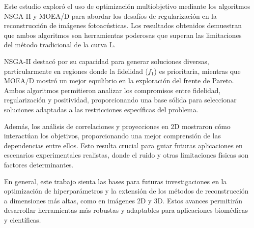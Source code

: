 Este estudio exploró el uso de optimización multiobjetivo mediante los algoritmos NSGA-II y MOEA/D para abordar los desafíos de regularización en la reconstrucción de imágenes fotoacústicas. Los resultados obtenidos demuestran que ambos algoritmos son herramientas poderosas que superan las limitaciones del método tradicional de la curva L. 

NSGA-II destacó por su capacidad para generar soluciones diversas, particularmente en regiones donde la fidelidad (\( f_1 \)) es prioritaria, mientras que MOEA/D mostró un mejor equilibrio en la exploración del frente de Pareto. Ambos algoritmos permitieron analizar los compromisos entre fidelidad, regularización y positividad, proporcionando una base sólida para seleccionar soluciones adaptadas a las restricciones específicas del problema.

Además, los análisis de correlaciones y proyecciones en 2D mostraron cómo interactúan los objetivos, proporcionando una mejor comprensión de las dependencias entre ellos. Esto resulta crucial para guiar futuras aplicaciones en escenarios experimentales realistas, donde el ruido y otras limitaciones físicas son factores determinantes.

En general, este trabajo sienta las bases para futuras investigaciones en la optimización de hiperparámetros y la extensión de los métodos de reconstrucción a dimensiones más altas, como en imágenes 2D y 3D. Estos avances permitirán desarrollar herramientas más robustas y adaptables para aplicaciones biomédicas y científicas.
